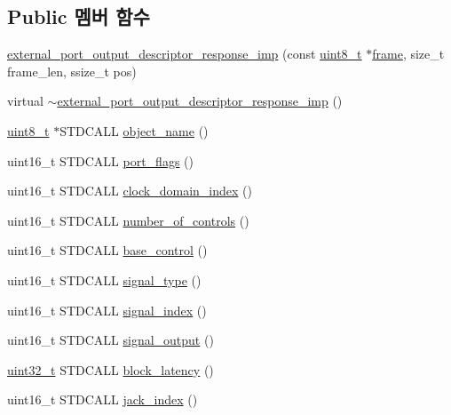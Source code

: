 \subsection*{Public 멤버 함수}
\begin{DoxyCompactItemize}
\item 
\hyperlink{classavdecc__lib_1_1external__port__output__descriptor__response__imp_a856ccd9a62b38047301f44a443e97c96}{external\+\_\+port\+\_\+output\+\_\+descriptor\+\_\+response\+\_\+imp} (const \hyperlink{stdint_8h_aba7bc1797add20fe3efdf37ced1182c5}{uint8\+\_\+t} $\ast$\hyperlink{gst__avb__playbin_8c_ac8e710e0b5e994c0545d75d69868c6f0}{frame}, size\+\_\+t frame\+\_\+len, ssize\+\_\+t pos)
\item 
virtual \hyperlink{classavdecc__lib_1_1external__port__output__descriptor__response__imp_aa56015a272511d0c0346d7dddf91f2d7}{$\sim$external\+\_\+port\+\_\+output\+\_\+descriptor\+\_\+response\+\_\+imp} ()
\item 
\hyperlink{stdint_8h_aba7bc1797add20fe3efdf37ced1182c5}{uint8\+\_\+t} $\ast$S\+T\+D\+C\+A\+LL \hyperlink{classavdecc__lib_1_1external__port__output__descriptor__response__imp_a15837e3eb254ad44812cb766ae8cd53c}{object\+\_\+name} ()
\item 
uint16\+\_\+t S\+T\+D\+C\+A\+LL \hyperlink{classavdecc__lib_1_1external__port__output__descriptor__response__imp_ae5cbe71db539f040ce51a399c2ba66c5}{port\+\_\+flags} ()
\item 
uint16\+\_\+t S\+T\+D\+C\+A\+LL \hyperlink{classavdecc__lib_1_1external__port__output__descriptor__response__imp_a25f4f17a510b3f05e97806cd40751774}{clock\+\_\+domain\+\_\+index} ()
\item 
uint16\+\_\+t S\+T\+D\+C\+A\+LL \hyperlink{classavdecc__lib_1_1external__port__output__descriptor__response__imp_abdf54b1d2b03f5f2b7346ddc9d93df5c}{number\+\_\+of\+\_\+controls} ()
\item 
uint16\+\_\+t S\+T\+D\+C\+A\+LL \hyperlink{classavdecc__lib_1_1external__port__output__descriptor__response__imp_a81a06cae8ad2431f6a3e067cc210aa98}{base\+\_\+control} ()
\item 
uint16\+\_\+t S\+T\+D\+C\+A\+LL \hyperlink{classavdecc__lib_1_1external__port__output__descriptor__response__imp_a34860693b568102d329b58e59fc48de5}{signal\+\_\+type} ()
\item 
uint16\+\_\+t S\+T\+D\+C\+A\+LL \hyperlink{classavdecc__lib_1_1external__port__output__descriptor__response__imp_a241ca834786f33bea20ff8108b16655c}{signal\+\_\+index} ()
\item 
uint16\+\_\+t S\+T\+D\+C\+A\+LL \hyperlink{classavdecc__lib_1_1external__port__output__descriptor__response__imp_a9959f2c7f3f5be25a66967f1b8feba97}{signal\+\_\+output} ()
\item 
\hyperlink{parse_8c_a6eb1e68cc391dd753bc8ce896dbb8315}{uint32\+\_\+t} S\+T\+D\+C\+A\+LL \hyperlink{classavdecc__lib_1_1external__port__output__descriptor__response__imp_af73005227357cf68983ec8157b6c0ad9}{block\+\_\+latency} ()
\item 
uint16\+\_\+t S\+T\+D\+C\+A\+LL \hyperlink{classavdecc__lib_1_1external__port__output__descriptor__response__imp_af493762143bc0c46de8f0116451c51c4}{jack\+\_\+index} ()
\end{DoxyCompactItemize}
